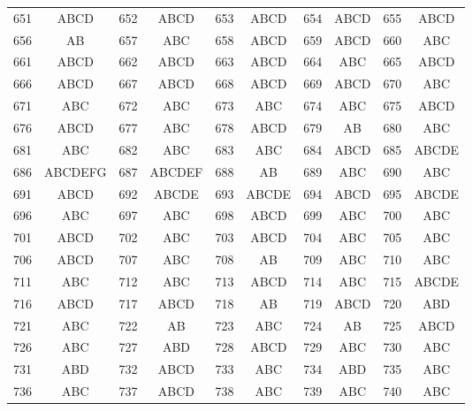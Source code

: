\begin{longtable}{cc|cc|cc|cc|cc}
651 & ABCD & 652 & ABCD & 653 & ABCD & 654 & ABCD & 655 & ABCD \\
656 & AB & 657 & ABC & 658 & ABCD & 659 & ABCD & 660 & ABC \\
661 & ABCD & 662 & ABCD & 663 & ABCD & 664 & ABC & 665 & ABCD \\
666 & ABCD & 667 & ABCD & 668 & ABCD & 669 & ABCD & 670 & ABC \\
671 & ABC & 672 & ABC & 673 & ABC & 674 & ABC & 675 & ABCD \\
676 & ABCD & 677 & ABC & 678 & ABCD & 679 & AB & 680 & ABC \\
681 & ABC & 682 & ABC & 683 & ABC & 684 & ABCD & 685 & ABCDE \\
686 & ABCDEFG & 687 & ABCDEF & 688 & AB & 689 & ABC & 690 & ABC \\
691 & ABCD & 692 & ABCDE & 693 & ABCDE & 694 & ABCD & 695 & ABCDE \\
696 & ABC & 697 & ABC & 698 & ABCD & 699 & ABC & 700 & ABC \\
701 & ABCD & 702 & ABC & 703 & ABCD & 704 & ABC & 705 & ABC \\
706 & ABCD & 707 & ABC & 708 & AB & 709 & ABC & 710 & ABC \\
711 & ABC & 712 & ABC & 713 & ABCD & 714 & ABC & 715 & ABCDE \\
716 & ABCD & 717 & ABCD & 718 & AB & 719 & ABCD & 720 & ABD \\
721 & ABC & 722 & AB & 723 & ABC & 724 & AB & 725 & ABCD \\
726 & ABC & 727 & ABD & 728 & ABCD & 729 & ABC & 730 & ABC \\
731 & ABD & 732 & ABCD & 733 & ABC & 734 & ABD & 735 & ABC \\
736 & ABC & 737 & ABCD & 738 & ABC & 739 & ABC & 740 & ABC \\
\bottomrule
\end{longtable}

\clearpage
